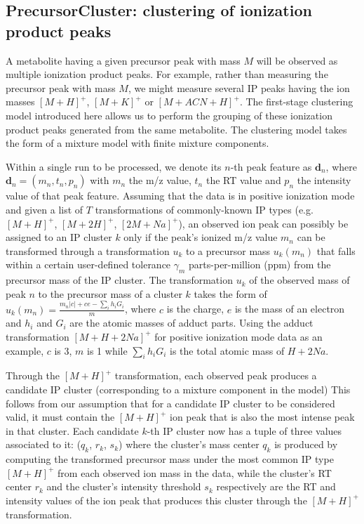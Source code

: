 \subsection{PrecursorCluster: clustering of ionization product peaks\label{sub:ip-clustering}}

A metabolite having a given precursor peak with mass $M$ will be observed as multiple ionization product peaks. For example, rather than measuring the precursor peak with mass $M$, we might measure several IP peaks having the ion masses $[M+H]^+$, $[M+K]^+$ or $[M+ACN+H]^+$. The first-stage clustering model introduced here allows us to perform the grouping of these ionization product peaks generated from the same metabolite. The clustering model takes the form of a mixture model with finite mixture components. 

Within a single run to be processed, we denote its $n$-th peak feature as $\textbf{d}_n$, where $\boldsymbol{d}_n=(m_n,t_n,p_n)$ with $m_n$ the m/z value, $t_n$ the RT value and $p_n$ the intensity value of that peak feature. Assuming that the data is in positive ionization mode and given a list of $T$ transformations of commonly-known IP types (e.g. $[M+H]^+$, $[M+2H]^+$, $[2M+Na]^+$), an observed ion peak can possibly be assigned to an IP cluster $k$ only if the peak's ionized m/z value $m_n $ can be transformed through a transformation $u_k$ to a precursor mass $u_k(m_n)$ that falls within a certain user-defined tolerance $\gamma_m$ parts-per-million (ppm) from the precursor mass of the IP cluster. The transformation $u_k$ of the observed mass of peak $n$ to the precursor mass of a cluster $k$ takes the form of $u_k(m_n) = \frac{m_n|c|+ce-\sum_{i} h_i G_i}{m}$, where $c$ is the charge, $e$ is the mass of an electron and $h_i$ and $G_i$ are the atomic masses of adduct parts. Using the adduct transformation $[M+H+2Na]^+$ for positive ionization mode data as an example, $c$ is 3, $m$ is 1 while $\sum_{i} h_i G_i$ is the total atomic mass of $H+2Na$. 

Through the $[M+H]^+$ transformation, each observed peak produces a candidate IP cluster (corresponding to a mixture component in the model)  This follows from our assumption that for a candidate IP cluster to be considered valid, it must contain the $[M+H]^+$ ion peak that is also the most intense peak in that cluster. Each candidate $k$-th IP cluster now has a tuple of three values associated to it: ($q_k$, $r_k$, $s_k$) where the cluster's mass center $q_k$ is produced by computing the transformed precursor mass under the most common IP type $[M+H]^+$ from each observed ion mass in the data, while the cluster's RT center $r_k$ and the cluster's intensity threshold $s_k$ respectively are the RT and intensity values of the ion peak that produces this cluster through the $[M+H]^+$ transformation. 

